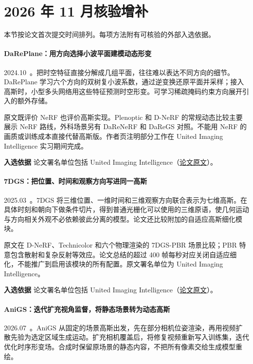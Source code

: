 \section{2026 年 11 月核验增补}

本节按论文首次提交时间排列。每项方法附有可核验的外部入选依据。

\paragraph{DaRePlane：用方向选择小波平面建模动态形变}
2024.10~\cite{2410_14169}。把时空特征直接分解成几组平面，往往难以表达不同方向的细节。DaRePlane 学习六个方向的双树复小波系数，通过逆变换还原平面并采样；接入高斯时，小型多头网络用这些特征预测时空形变。可学习稀疏掩码约束方向展开引入的额外存储。

原文既评价 NeRF 也评价高斯实现。Plenoptic 和 D-NeRF 的常规动态比较主要展示 NeRF 路线，外科场景另有 DaReNeRF 和 DaReGS 对照。不能用 NeRF 的画质或训练成本直接代替高斯版。作者页注明部分工作在 United Imaging Intelligence 实习期间完成。

\textbf{入选依据} 论文署名单位包括 United Imaging Intelligence（\href{https://arxiv.org/html/2410.14169}{论文原文}）。

\paragraph{7DGS：把位置、时间和观察方向写进同一高斯}
2025.03~\cite{2503_07946}。7DGS 将三维位置、一维时间和三维观察方向联合表示为七维高斯。在具体时刻和朝向下做条件切片，得到普通光栅化可以使用的三维原语，使几何运动与方向相关外观不必依赖彼此分离的模型。论文还比较附加的自适应高斯细化模块。

原文在 D-NeRF、Technicolor 和六个物理渲染的 7DGS-PBR 场景比较；PBR 特意包含散射和复杂反射等效应。论文总结的超过 400 帧每秒对应关闭自适应细化，不能推广到启用该模块的所有配置。原文署名单位为 United Imaging Intelligence。

\textbf{入选依据} 论文署名单位包括 United Imaging Intelligence（\href{https://arxiv.org/html/2503.07946v1}{论文原文}）。

\paragraph{AniGS：迭代扩充视角监督，将静态场景转为动态高斯}
2026.07~\cite{2607_18539}。AniGS 从固定的场景高斯出发，先在部分相机位姿渲染，再用视频扩散先验为选定区域生成运动。扩充相机覆盖后，将修复视频重新写入训练集，迭代优化时序形变场。合成时保留原场景的静态内容，不把所有像素交给生成模型重绘。

